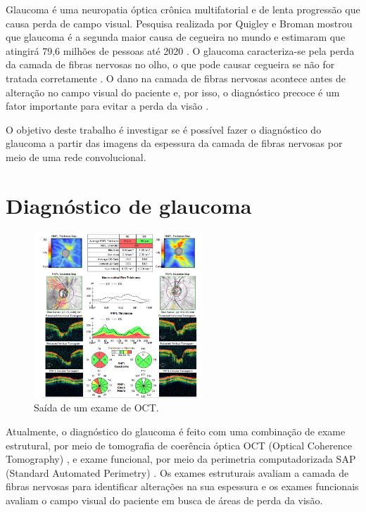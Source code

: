 \documentclass[conference]{IEEEtran}
\begin{document}
Glaucoma é uma neuropatia óptica crônica multifatorial e de lenta progressão que causa perda de campo visual. Pesquisa realizada por Quigley e Broman mostrou que glaucoma é a segunda maior causa de cegueira no mundo e estimaram que atingirá 79,6 milhões de pessoas até 2020 \cite{Quigley2006}. O glaucoma caracteriza-se pela perda da camada de fibras nervosas no olho, o que pode causar cegueira se não for tratada corretamente \cite{Quigley2011}. O dano na camada de fibras nervosas acontece antes de alteração no campo visual do paciente e, por isso, o diagnóstico precoce é um fator importante para evitar a perda da visão \cite{Malik2012}.

O objetivo deste trabalho é investigar se é possível fazer o diagnóstico do glaucoma a partir das imagens da espessura da camada de fibras nervosas por meio de uma rede convolucional.

\section{Diagnóstico de glaucoma}


\begin{figure}[!tp]
  \centering
  \includegraphics[width=2.5in]{img/oct.png}
  \caption{Saída de um exame de OCT.}
  \label{fig:oct}
\end{figure}


Atualmente, o diagnóstico do glaucoma é feito com uma combinação de exame estrutural, por meio de tomografia de coerência óptica OCT (Optical Coherence Tomography) \cite{Wollstein2005}, e exame funcional, por meio da perimetria computadorizada SAP (Standard Automated Perimetry) \cite{chauhan1990}. Os exames estruturais avaliam a camada de fibras nervosas para identificar alterações na sua espessura e os exames funcionais avaliam o campo visual do paciente em busca de áreas de perda da visão. 
\end{document}
